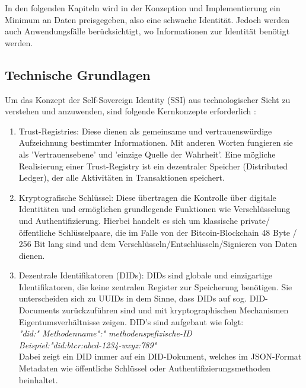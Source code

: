 In den folgenden Kapiteln wird in der Konzeption und Implementierung ein Minimum an Daten preisgegeben, also eine schwache Identität. Jedoch werden auch Anwendungsfälle berücksichtigt, wo Informationen zur Identität benötigt werden.

\subsection{Technische Grundlagen}
Um das Konzept der Self-Sovereign Identity (SSI) aus technologischer Sicht zu verstehen und anzuwenden, sind folgende Kernkonzepte erforderlich \cite{ID16} \cite{ID17}:

\begin{enumerate}
	\item Trust-Registries: Diese dienen als gemeinsame und vertrauenswürdige Aufzeichnung bestimmter Informationen. Mit anderen Worten fungieren sie als 'Vertrauensebene' und 'einzige Quelle der Wahrheit'. Eine mögliche Realisierung einer Trust-Registry ist ein dezentraler Speicher (Distributed Ledger), der alle Aktivitäten in Transaktionen speichert.
	
	\item Kryptografische Schlüssel: Diese übertragen die Kontrolle über digitale Identitäten und ermöglichen grundlegende Funktionen wie Verschlüsselung und Authentifizierung. Hierbei handelt es sich um klassische private/öffentliche Schlüsselpaare, die im Falle von der Bitcoin-Blockchain 48 Byte / 256 Bit lang sind \cite{ID15} und dem Verschlüsseln/Entschlüsseln/Signieren von Daten dienen.
	
	\item Dezentrale Identifikatoren (DIDs): DIDs sind globale und einzigartige Identifikatoren, die keine zentralen Register zur Speicherung benötigen. Sie unterscheiden sich zu UUIDs in dem Sinne, dass DIDs auf sog. DID-Documents zurückzuführen sind und mit kryptographischen Mechanismen Eigentumsverhältnisse zeigen. DID's sind aufgebaut wie folgt:\\
	\textsl{"did:" \textlangle Methodenname\textrangle ":" \textlangle methodenspefizische-ID\textrangle\\
	Beispiel:"did:btcr:abcd-1234-wxyz:789"}\\
	Dabei zeigt ein DID immer auf ein DID-Dokument, welches im JSON-Format Metadaten wie öffentliche Schlüssel oder Authentifizierungsmethoden beinhaltet.
	

\end{enumerate}
